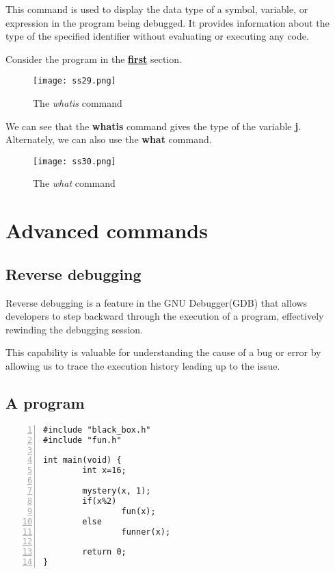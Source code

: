 \documentclass{article}
\makeatletter
\renewcommand\paragraph{\@startsection{paragraph}{4}{\z@}{-3.25ex \@plus -1ex \@minus -.2ex}{1.5ex \@plus .2ex}{\normalfont\normalsize\bfseries}}
\makeatother
\begin{document}
\paragraph{}
This command is used to display the data type of a symbol, variable, or expression in the program being debugged. It provides information about the type of the specified identifier without evaluating or executing any code.

Consider the program in the \textbf{\hyperref[sec:GDB]{first}} section.

\begin{figure}[h]
\centering
\texttt{[image: ss29.png]}
\caption{The \textit{whatis} command}
\end{figure}

We can see that the \textbf{whatis} command gives the type of the variable \textbf{j}.
Alternately, we can also use the \textbf{what} command.
\begin{figure}[h]
\centering
\texttt{[image: ss30.png]}
\caption{The \textit{what} command}
\end{figure}

\newpage
\section{Advanced commands}
\subsection{Reverse debugging}
Reverse debugging is a feature in the GNU Debugger(GDB) that allows developers to step backward through the execution of a program, effectively rewinding the debugging session.

This capability is valuable for understanding the cause of a bug or error by allowing us to trace the execution history leading up to the issue.

\subsection{A program}\label{sec:program}
\begin{Verbatim}[numbers=left, frame=single]
#include "black_box.h"
#include "fun.h"

int main(void) {
        int x=16;

        mystery(x, 1);
        if(x%2)
                fun(x);
        else
                funner(x);

        return 0;
}
\end{Verbatim}
\end{document}
